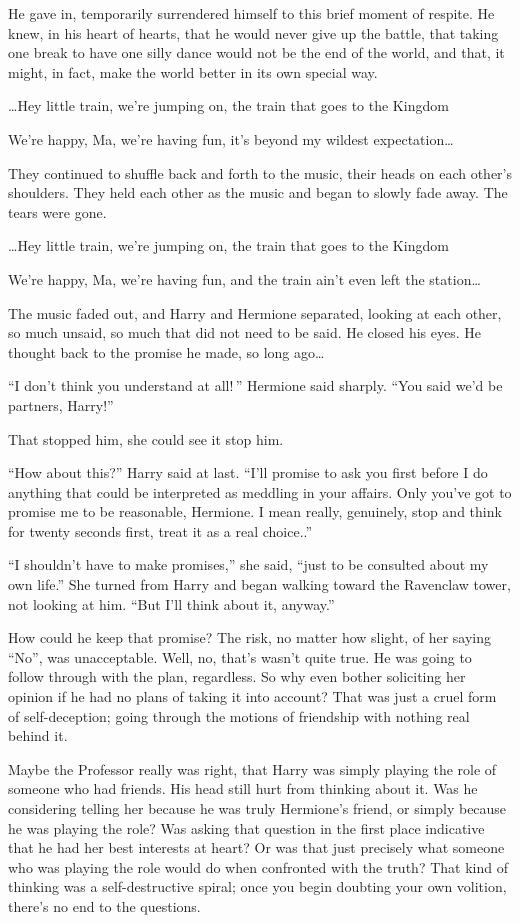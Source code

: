 He gave in, temporarily surrendered himself to this brief moment of respite. He knew, in his heart of hearts, that he would never give up the battle, that taking one break to have one silly dance would not be the end of the world, and that, it might, in fact, make the world better in its own special way.

…Hey little train, we’re jumping on, the train that goes to the Kingdom

We’re happy, Ma, we’re having fun, it’s beyond my wildest expectation…

They continued to shuffle back and forth to the music, their heads on each other’s shoulders. They held each other as the music and began to slowly fade away. The tears were gone.

…Hey little train, we’re jumping on, the train that goes to the Kingdom

We’re happy, Ma, we’re having fun, and the train ain’t even left the station…

The music faded out, and Harry and Hermione separated, looking at each other, so much unsaid, so much that did not need to be said. He closed his eyes. He thought back to the promise he made, so long ago…

“I don’t think you understand at all! ” Hermione said sharply. “You said we’d be partners, Harry!”

That stopped him, she could see it stop him.

“How about this?” Harry said at last. “I’ll promise to ask you first before I do anything that could be interpreted as meddling in your affairs. Only you’ve got to promise me to be reasonable, Hermione. I mean really, genuinely, stop and think for twenty seconds first, treat it as a real choice..”

“I shouldn’t have to make promises,” she said, “just to be consulted about my own life.” She turned from Harry and began walking toward the Ravenclaw tower, not looking at him. “But I’ll think about it, anyway.”

How could he keep that promise? The risk, no matter how slight, of her saying “No”, was unacceptable. Well, no, that’s wasn’t quite true. He was going to follow through with the plan, regardless. So why even bother soliciting her opinion if he had no plans of taking it into account?  That was just a cruel form of self-deception; going through the motions of friendship with nothing real behind it.

Maybe the Professor really was right, that Harry was simply playing the role of someone who had friends. His head still hurt from thinking about it. Was he considering telling her because he was truly Hermione’s friend, or simply because he was playing the role? Was asking that question in the first place indicative that he had her best interests at heart? Or was that just precisely what someone who was playing the role would do when confronted with the truth?  That kind of thinking was a self-destructive spiral; once you begin doubting your own volition, there’s no end to the questions.

